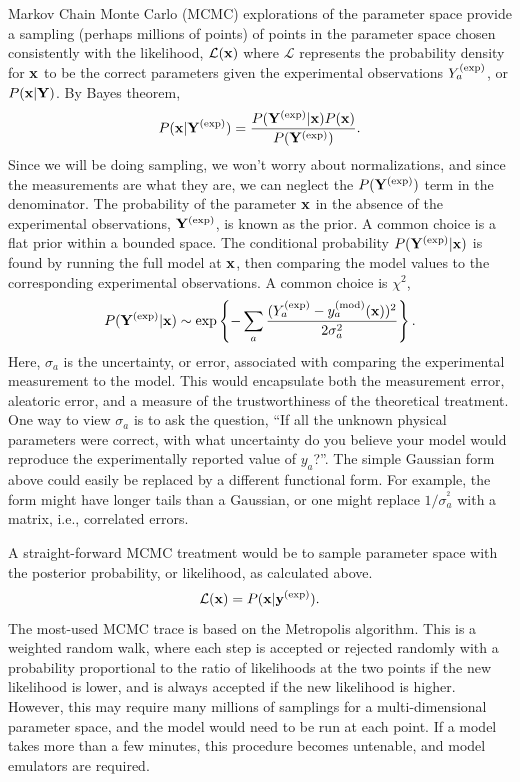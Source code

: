 Markov Chain Monte Carlo (MCMC) explorations of the parameter space provide a sampling (perhaps millions of points) of points in the parameter space chosen consistently with the likelihood, ${\mathcal L}({\bf x})$ where ${\mathcal L}$ represents the probability density for ${\bf x}$ to be the correct parameters given the experimental observations $Y^{\rm(exp)}_a$, or $P({\bf x}|{\bf Y})$. By Bayes theorem,
\begin{equation}
P({\bf x}|{\bf Y}^{\rm(exp)}) = \frac{P({\bf Y}^{\rm(exp)}|{\bf x}) P({\bf x})}{P({\bf Y}^{\rm(exp)})}.
\end{equation}
Since we will be doing sampling, we won't worry about normalizations, and since the measurements are what they are, we can neglect the $P({\bf Y}^{\rm(exp)})$ term in the denominator. The probability of the parameter ${\bf x}$ in the absence of the experimental observations, ${\bf Y}^{\rm(exp)}$, is known as the prior. A common choice is a flat prior within a bounded space. The conditional probability $P({\bf Y}^{\rm(exp)}|{\bf x})$ is found by running the full model at ${\bf x}$, then comparing the model values to the corresponding experimental observations. A common choice is $\chi^2$,
\begin{equation}
P({\bf Y}^{\rm(exp)}|{\bf x})\sim \exp\left\{-
\sum_a\frac{(Y^{\rm(exp)}_a-y_a^{\rm(mod)}({\bf x}))^2}{2\sigma_a^2}\right\}.
\end{equation}
Here, $\sigma_a$ is the uncertainty, or error, associated with comparing the experimental measurement to the model. This would encapsulate both the measurement error, aleatoric error, and a measure of the trustworthiness of the theoretical treatment. One way to view $\sigma_a$ is to ask the question, ``If all the unknown physical parameters were correct, with what uncertainty do you believe your model would reproduce the experimentally reported value of $y_a$?''. The simple Gaussian form above could easily be replaced by a different functional form. For example, the form might have longer tails than a Gaussian, or one might replace $1/\sigma_a^^2$ with a matrix, i.e., correlated errors.

A straight-forward MCMC treatment would be to sample parameter space with the posterior probability, or likelihood, as calculated above.
\[
{\mathcal L}({\bf x})=P({\bf x}|{\bf y^{\rm(exp)}}).
\]
The most-used MCMC trace is based on the Metropolis algorithm. This is a weighted random walk, where each step is accepted or rejected randomly with a probability proportional to the ratio of likelihoods at the two points if the new likelihood is lower, and is always accepted if the new likelihood is higher. However, this may require many millions of samplings for a multi-dimensional parameter space, and the model would need to be run at each point. If a model takes more than a few minutes, this procedure becomes untenable, and model emulators are required.

